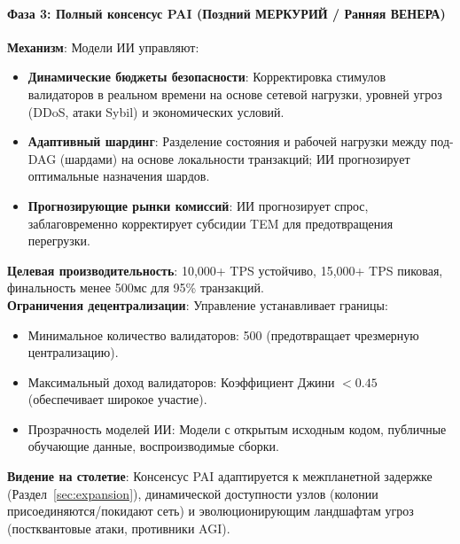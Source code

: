 \documentclass[11pt]{article}
\begin{document}
\paragraph{Фаза 3: Полный консенсус PAI (Поздний МЕРКУРИЙ / Ранняя ВЕНЕРА)}
\textbf{Механизм}: Модели ИИ управляют:
\begin{itemize}[noitemsep]
  \item \textbf{Динамические бюджеты безопасности}: Корректировка стимулов валидаторов в реальном времени на основе сетевой нагрузки, уровней угроз (DDoS, атаки Sybil) и экономических условий.
  \item \textbf{Адаптивный шардинг}: Разделение состояния и рабочей нагрузки между под-DAG (шардами) на основе локальности транзакций; ИИ прогнозирует оптимальные назначения шардов.
  \item \textbf{Прогнозирующие рынки комиссий}: ИИ прогнозирует спрос, заблаговременно корректирует субсидии TEM для предотвращения перегрузки.
\end{itemize}
\textbf{Целевая производительность}: 10,000+ TPS устойчиво, 15,000+ TPS пиковая, финальность менее 500мс для 95\% транзакций.\\
\textbf{Ограничения децентрализации}: Управление устанавливает границы:
\begin{itemize}[noitemsep]
  \item Минимальное количество валидаторов: 500 (предотвращает чрезмерную централизацию).
  \item Максимальный доход валидаторов: Коэффициент Джини $<0.45$ (обеспечивает широкое участие).
  \item Прозрачность моделей ИИ: Модели с открытым исходным кодом, публичные обучающие данные, воспроизводимые сборки.
\end{itemize}
\textbf{Видение на столетие}: Консенсус PAI адаптируется к межпланетной задержке (Раздел~\ref{sec:expansion}), динамической доступности узлов (колонии присоединяются/покидают сеть) и эволюционирующим ландшафтам угроз (постквантовые атаки, противники AGI).
\end{document}
